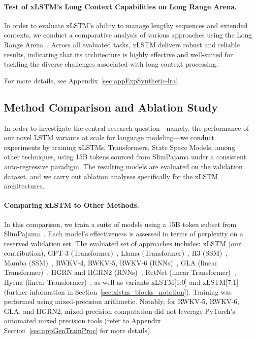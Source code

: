 \paragraph{Test of xLSTM's Long Context Capabilities on Long Range Arena.} In order to evaluate xLSTM's ability to manage lengthy sequences and extended contexts, we conduct a comparative analysis of various approaches using the Long Range Arena~\citep{Tay:21}. Across all evaluated tasks, xLSTM delivers robust and reliable results, indicating that its architecture is highly effective and well-suited for tackling the diverse challenges associated with long context processing.

For more details, see Appendix~\ref{sec:appExpSynthetic-lra}.

\subsection{Method Comparison and Ablation Study}
\label{sec:ExpComparison}

In order to investigate the central research question—namely, the performance of our novel LSTM variants at scale for language modeling—we conduct experiments by training xLSTMs, Transformers, State Space Models, among other techniques, using 15B tokens sourced from SlimPajama under a consistent auto-regressive paradigm. The resulting models are evaluated on the validation dataset, and we carry out ablation analyses specifically for the xLSTM architectures.

\paragraph{Comparing xLSTM to Other Methods.} In this comparison, we train a suite of models using a 15B token subset from SlimPajama~\citep{Soboleva:23}. Each model’s effectiveness is assessed in terms of perplexity on a reserved validation set. The evaluated set of approaches includes: xLSTM (our contribution), GPT-3 (Transformer)~\citep{Brown:20short}, Llama (Transformer)~\citep{Touvron:23arxiv}, H3 (SSM)~\citep{Fu:23}, Mamba (SSM)~\citep{Gu:24arxiv}, RWKV-4, RWKV-5, RWKV-6 (RNNs)~\citep{Peng:23arxivshort,Peng:24arxivshort}, GLA (linear Transformer)~\citep{Yang:23arxiv}, HGRN and HGRN2 (RNNs)~\citep{Qin:23,Qin:24arxiv}, RetNet (linear Transformer)~\citep{Sun:23arxiv}, Hyena (linear Transformer)~\citep{Poli:23}, as well as variants xLSTM[1:0] and xLSTM[7:1] (further information in Section~\ref{sec:xlstm_blocks_notation}). Training was performed using mixed-precision arithmetic. Notably, for RWKV-5, RWKV-6, GLA, and HGRN2, mixed-precision computation did not leverage PyTorch’s automated mixed precision tools (refer to Appendix Section~\ref{sec:appGenTrainProc} for more details).

